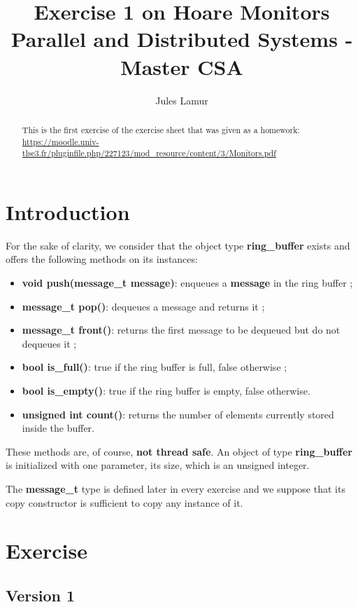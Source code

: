 \documentclass[a4paper, 12pt]{article}
\title{Exercise 1 on Hoare Monitors
    \\ \large Parallel and Distributed Systems - Master CSA}
\author{Jules Lamur}
\begin{document}
\maketitle

\begin{abstract}
    This is the first exercise of the exercise sheet that was given as a
    homework:
    \url{https://moodle.univ-tlse3.fr/pluginfile.php/227123/mod_resource/content/3/Monitors.pdf}
\end{abstract}

\section{Introduction}

For the sake of clarity, we consider that the object type \textbf{ring\_buffer}
exists and offers the following methods on its instances:

\begin{itemize}
    \item \textbf{void push(message\_t message)}: enqueues a \textbf{message} in
        the ring buffer ;
    \item \textbf{message\_t pop()}: dequeues a message and returns it ;
    \item \textbf{message\_t front()}: returns the first message to be dequeued
        but do not dequeues it ;
    \item \textbf{bool is\_full()}: true if the ring buffer is full, false
        otherwise ;
    \item \textbf{bool is\_empty()}: true if the ring buffer is empty, false
        otherwise.
    \item \textbf{unsigned int count()}: returns the number of elements
        currently stored inside the buffer.
\end{itemize}

These methods are, of course, \textbf{not thread safe}.
An object of type \textbf{ring\_buffer} is initialized with one parameter, its
size, which is an unsigned integer.

The \textbf{message\_t} type is defined later in every exercise and we suppose
that its copy constructor is sufficient to copy any instance of it.

\pagebreak

\section{Exercise}
\subsection{Version 1}
\end{document}
